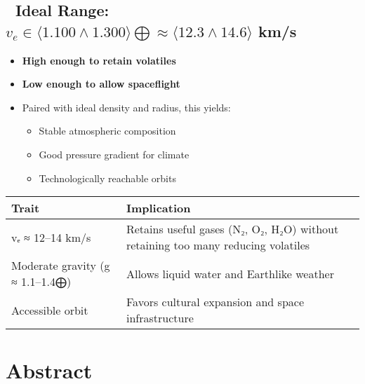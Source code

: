 \documentclass[
  letterpaper,
]{book}
\providecommand{\tightlist}{%
  \setlength{\itemsep}{0pt}\setlength{\parskip}{0pt}}
\begin{document}
\subsection{\texorpdfstring{🧭 Ideal Range:
\(v_e ∈ \langle1.100 ∧ 1.300\rangle⨁ ≈ ⟨12.3 ∧ 14.6⟩\)
km/s}{🧭 Ideal Range: v\_e ∈ \textbackslash langle1.100 ∧ 1.300\textbackslash rangle⨁ ≈ ⟨12.3 ∧ 14.6⟩ km/s}}\label{ideal-range-v_e-langle1.100-1.300rangle-12.3-14.6-kms}

\begin{itemize}
\tightlist
\item
  \textbf{High enough to retain volatiles}
\item
  \textbf{Low enough to allow spaceflight}
\item
  Paired with ideal density and radius, this yields:

  \begin{itemize}
  \tightlist
  \item
    Stable atmospheric composition
  \item
    Good pressure gradient for climate
  \item
    Technologically reachable orbits
  \end{itemize}
\end{itemize}

\begin{longtable}[]{@{}
  >{\raggedright\arraybackslash}p{}
  >{\raggedright\arraybackslash}p{}@{}}
\toprule\noalign{}
\begin{minipage}[b]{\linewidth}\raggedright
Trait
\end{minipage} & \begin{minipage}[b]{\linewidth}\raggedright
Implication
\end{minipage} \\
\midrule\noalign{}
\endhead
\bottomrule\noalign{}
\endlastfoot
vₑ ≈ 12--14 km/s & Retains useful gases (N₂, O₂, H₂O) without retaining
too many reducing volatiles \\
Moderate gravity (g ≈ 1.1--1.4⨁) & Allows liquid water and Earthlike
weather \\
Accessible orbit & Favors cultural expansion and space infrastructure \\
\end{longtable}

\section{Abstract}\label{abstract-22}
\end{document}
